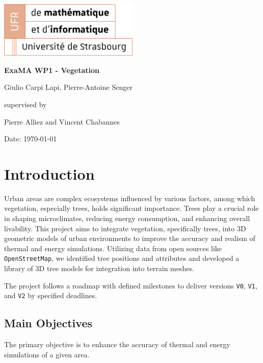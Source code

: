 \documentclass[12pt]{article}
\begin{document}
\begin{titlepage}
\centering
\includegraphics[width=0.5\textwidth]{images/logo_ufr.png}\par\vspace{1cm}
\vspace{1.5cm}
{\huge\bfseries ExaMA WP1 - Vegetation\par}
\vspace{2cm}
{\Large Giulio Carpi Lapi, Pierre-Antoine Senger\par}
\vfill
supervised by\par
Pierre Alliez and Vincent Chabannes

\vfill

{\large Date: \today\par}
\end{titlepage}

\tableofcontents
\newpage

\section{Introduction}
Urban areas are complex ecosystems influenced by various factors, among which
vegetation, especially trees, holds significant importance. Trees play a crucial
role in shaping microclimates, reducing energy consumption, and enhancing overall
livability\cite{TIR4sTREEt}. This project aims to integrate vegetation, specifically trees, into 3D
geometric models of urban environments to improve the accuracy and realism of thermal
and energy simulations. Utilizing data from open sources like \texttt{OpenStreetMap},
we identified tree positions and attributes and developed a library of 3D tree
models for integration into terrain meshes.

The project follows a roadmap with defined milestones to deliver versions
\texttt{V0}, \texttt{V1}, and \texttt{V2} by specified  deadlines.

\subsection{Main Objectives}

The primary objective is to enhance the accuracy of thermal and energy
simulations of a given area.
\end{document}

